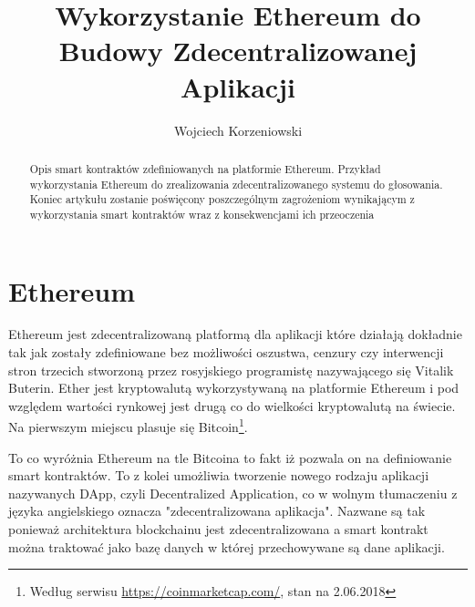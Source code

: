 \documentclass[]{llncs}
\begin{document}
\title{Wykorzystanie Ethereum do Budowy Zdecentralizowanej Aplikacji}
\author{Wojciech Korzeniowski}

\maketitle

\begin{abstract}

  Opis smart kontraktów zdefiniowanych na platformie Ethereum. Przykład
  wykorzystania Ethereum do zrealizowania zdecentralizowanego systemu do
  głosowania. Koniec artykułu zostanie poświęcony poszczególnym zagrożeniom
  wynikającym z wykorzystania smart kontraktów wraz z konsekwencjami ich
  przeoczenia


\end{abstract}

\section{Ethereum}

  Ethereum\cite{ethereum} jest zdecentralizowaną platformą dla aplikacji które
  działają dokładnie tak jak zostały zdefiniowane bez możliwości oszustwa,
  cenzury czy interwencji stron trzecich stworzoną przez rosyjskiego programistę
  nazywającego się Vitalik Buterin. Ether jest kryptowalutą wykorzystywaną na
  platformie Ethereum i pod względem wartości rynkowej jest drugą co do
  wielkości kryptowalutą na świecie. Na pierwszym miejscu plasuje się
  Bitcoin\footnote{Według serwisu \url{https://coinmarketcap.com/}, stan na
  2.06.2018}.

  To co wyróżnia Ethereum na tle Bitcoina to fakt iż pozwala on na definiowanie
  smart kontraktów. To z kolei umożliwia tworzenie nowego rodzaju aplikacji
  nazywanych DApp, czyli Decentralized Application, co w wolnym tłumaczeniu z
  języka angielskiego oznacza "zdecentralizowana aplikacja". Nazwane są tak
  ponieważ architektura blockchainu jest zdecentralizowana a smart kontrakt
  można traktować jako bazę danych w której przechowywane są dane aplikacji.
\end{document}

